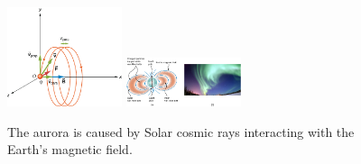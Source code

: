 \documentclass[12pt]{article}
\begin{document}
\begin{figure}[hb]
\centering
\includegraphics[width=0.3\textwidth]{figures/cyclo2.jpeg}
\includegraphics[width=0.3\textwidth,trim=0cm 0cm 9cm 0cm,clip=true]{figures/cyclo3.jpeg}
\caption{\label{fig:1} The aurora is caused by Solar cosmic rays interacting with the Earth's magnetic field.}
\end{figure}
\end{document}
